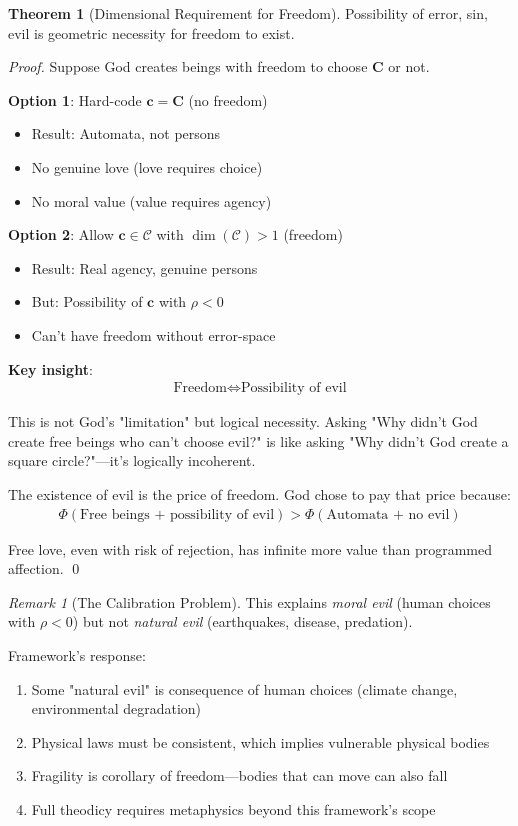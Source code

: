 \documentclass[11pt,a4paper]{article}
\theoremstyle{definition}
\newtheorem{theorem}{Theorem}[section]
\theoremstyle{remark}
\newtheorem{remark}{Remark}[section]
\newcommand{\CC}{\mathcal{C}}
\newcommand{\cc}{\mathbf{c}}
\begin{document}
\begin{small}
\begin{enumerate}
\begin{theorem}[Dimensional Requirement for Freedom]
Possibility of error, sin, evil is geometric necessity for freedom to exist.
\end{theorem}

\begin{proof}
Suppose God creates beings with freedom to choose \(\mathbf{C}\) or not.

\textbf{Option 1}: Hard-code \(\cc = \mathbf{C}\) (no freedom)
\begin{itemize}
    \item Result: Automata, not persons
    \item No genuine love (love requires choice)
    \item No moral value (value requires agency)
\end{itemize}

\textbf{Option 2}: Allow \(\cc \in \CC\) with \(\dim(\CC) > 1\) (freedom)
\begin{itemize}
    \item Result: Real agency, genuine persons
    \item But: Possibility of \(\cc\) with \(\rho < 0\)
    \item Can't have freedom without error-space
\end{itemize}

\textbf{Key insight}: 
\begin{align}
\text{Freedom} \iff \text{Possibility of evil}
\end{align}

This is not God's "limitation" but logical necessity. Asking "Why didn't God create free beings who can't choose evil?" is like asking "Why didn't God create a square circle?"—it's logically incoherent.

The existence of evil is the price of freedom. God chose to pay that price because:
\begin{align}
\Phi(\text{Free beings + possibility of evil}) > \Phi(\text{Automata + no evil})
\end{align}

Free love, even with risk of rejection, has infinite more value than programmed affection. \qed
\end{proof}

\begin{remark}[The Calibration Problem]
This explains \textit{moral evil} (human choices with \(\rho < 0\)) but not \textit{natural evil} (earthquakes, disease, predation).

Framework's response:
\begin{enumerate}
    \item Some "natural evil" is consequence of human choices (climate change, environmental degradation)
    \item Physical laws must be consistent, which implies vulnerable physical bodies
    \item Fragility is corollary of freedom—bodies that can move can also fall
    \item Full theodicy requires metaphysics beyond this framework's scope
\end{enumerate}


\end{remark}
\end{enumerate}
\end{small}
\end{document}
